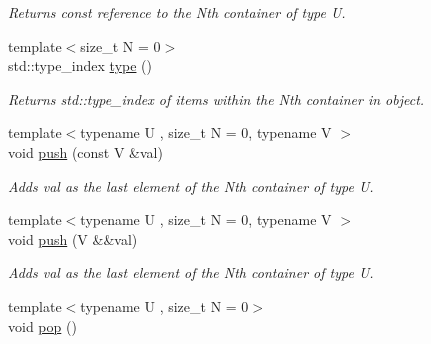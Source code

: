 \begin{DoxyCompactItemize}
\begin{DoxyCompactList}\small\item\em Returns const reference to the Nth container of type U. \end{DoxyCompactList}\item 
\hypertarget{classheterogeneous_1_1heteroqueue_3_01_t_00_01_types_8_8_8_4_a8763da8853f9b4a3c2b226fd261325a7}{}{\footnotesize template$<$size\+\_\+t N = 0$>$ }\\std\+::type\+\_\+index \hyperlink{classheterogeneous_1_1heteroqueue_3_01_t_00_01_types_8_8_8_4_a8763da8853f9b4a3c2b226fd261325a7}{type} ()\label{classheterogeneous_1_1heteroqueue_3_01_t_00_01_types_8_8_8_4_a8763da8853f9b4a3c2b226fd261325a7}

\begin{DoxyCompactList}\small\item\em Returns std\+::type\+\_\+index of items within the Nth container in object. \end{DoxyCompactList}\item 
\hypertarget{classheterogeneous_1_1heteroqueue_3_01_t_00_01_types_8_8_8_4_a6b27063824ac9a6224e417a9dec95732}{}{\footnotesize template$<$typename U , size\+\_\+t N = 0, typename V $>$ }\\void \hyperlink{classheterogeneous_1_1heteroqueue_3_01_t_00_01_types_8_8_8_4_a6b27063824ac9a6224e417a9dec95732}{push} (const V \&val)\label{classheterogeneous_1_1heteroqueue_3_01_t_00_01_types_8_8_8_4_a6b27063824ac9a6224e417a9dec95732}

\begin{DoxyCompactList}\small\item\em Adds val as the last element of the Nth container of type U. \end{DoxyCompactList}\item 
\hypertarget{classheterogeneous_1_1heteroqueue_3_01_t_00_01_types_8_8_8_4_a1c8dd103ab8196989b1bad8f825b6ae9}{}{\footnotesize template$<$typename U , size\+\_\+t N = 0, typename V $>$ }\\void \hyperlink{classheterogeneous_1_1heteroqueue_3_01_t_00_01_types_8_8_8_4_a1c8dd103ab8196989b1bad8f825b6ae9}{push} (V \&\&val)\label{classheterogeneous_1_1heteroqueue_3_01_t_00_01_types_8_8_8_4_a1c8dd103ab8196989b1bad8f825b6ae9}

\begin{DoxyCompactList}\small\item\em Adds val as the last element of the Nth container of type U. \end{DoxyCompactList}\item 
\hypertarget{classheterogeneous_1_1heteroqueue_3_01_t_00_01_types_8_8_8_4_a1aded124726491c693d8a50d379a220b}{}{\footnotesize template$<$typename U , size\+\_\+t N = 0$>$ }\\void \hyperlink{classheterogeneous_1_1heteroqueue_3_01_t_00_01_types_8_8_8_4_a1aded124726491c693d8a50d379a220b}{pop} ()\label{classheterogeneous_1_1heteroqueue_3_01_t_00_01_types_8_8_8_4_a1aded124726491c693d8a50d379a220b}


\end{DoxyCompactItemize}
